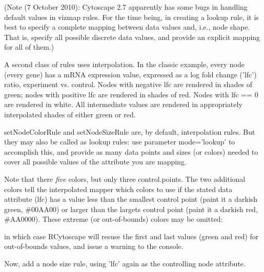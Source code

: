 \documentclass[12pt]{article}
\begin{document}
(Note (7 October 2010):  Cytoscape 2.7 apparently has some bugs in handling default values in vizmap rules.  For the time being, in creating a lookup rule, it is best to specify a complete mapping between data values and, i.e., node shape.  That is, specify all possible discrete data values, and provide an explicit mapping for all of them.)

A second class of rules uses interpolation.  In the classic example, every node (every gene) has a mRNA expression
value, expressed as a log fold change ('lfc') ratio, experiment vs. control.  Nodes with negative lfc are rendered in
shades of green; nodes with positive lfc are rendered in shades of red.  Nodes with lfc == 0 are rendered in white.  All
intermediate values are rendered in appropriately interpolated shades of either green or red.

setNodeColorRule and setNodeSizeRule are, by default, interpolation rules.  But they may also be called as lookup rules:  use parameter mode='lookup' to accomplish this, and provide as many data points and sizes (or colors) needed to cover all possible values of the attribute you are mapping.

\begin{Schunk}
\end{Schunk}
Note that there \emph{five} colors, but only three control.points.  The two additional colors tell the interpolated mapper which colors to use if the stated data attribute (lfc) has a value less than the smallest control point (paint it a darkish green, \#00AA00) or larger than the largets control point (paint it a darkish red, \#AA0000).  These extreme (or out-of-bounds) colors may be omitted:

\begin{Schunk}
\end{Schunk}

in which case RCytoscape will resuse the first and last values (green and red) for out-of-bounds values, and issue a warning to the console.

Now, add a node size rule, using 'lfc' again as the controlling node attribute.
\end{document}
